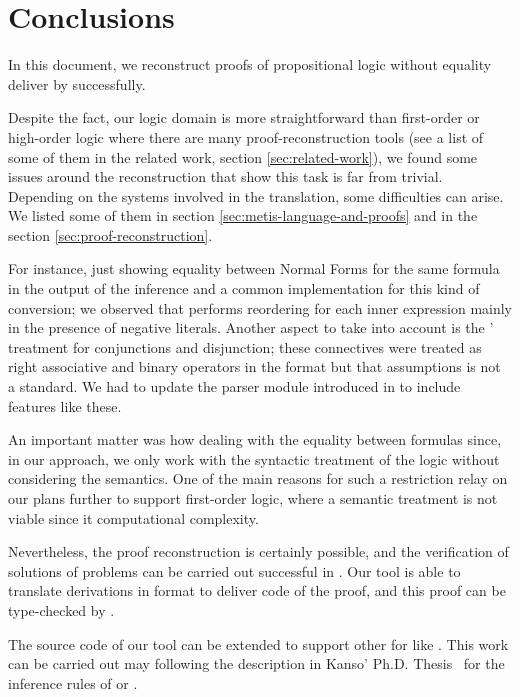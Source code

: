 \documentclass[../main.tex]{subfiles}
\begin{document}

\section{Conclusions}
\label{sec:conclusions}

In this document, we reconstruct proofs
of propositional logic without equality deliver by \Metis 
successfully.

Despite the fact, our logic domain is more straightforward than 
first-order or high-order logic where there are many 
proof-reconstruction tools (see a list of some of them in the 
related work, section \ref{sec:related-work}), we found some issues 
around the reconstruction that show this task is far from trivial.
Depending  on the systems involved in the translation, some 
difficulties can arise. We listed some of them in section
\ref{sec:metis-language-and-proofs} and in the section
\ref{sec:proof-reconstruction}.

For instance, just showing equality between Normal Forms for the
same formula in the output of the \canonicalize inference and a
common implementation for this kind of conversion; we observed that
\Metis performs reordering for each inner expression mainly in the
presence of negative literals. Another aspect to take into account
is the \Metis' treatment for conjunctions and disjunction;
these connectives were treated as right associative and binary
operators in the \TSTP format but that assumptions is not a standard.
We had to update the \TSTP parser module introduced in
\cite{Gomez-Londono2015} to include features like these.

An important matter was how dealing with
the equality between formulas since, in our approach, we only work
with the syntactic treatment of the logic without considering the
semantics.
One of the main reasons for such a restriction relay on our plans 
further to support first-order logic, where a semantic treatment is 
not viable since it computational complexity.

Nevertheless, the proof reconstruction is certainly possible, and
the verification of solutions of \CPL problems can be carried out
successful in \Agda. Our tool is able to translate \Metis
derivations in \TSTP format to deliver \Agda code of the proof,
and this proof can be type-checked by \Agda.

The source code of our tool can be extended to support
other \ATPs for \CPL like . This work can be carried out
may following the description in Kanso' Ph.D. Thesis~\cite{Kanso2012}
for the inference rules of  or .
\end{document}
